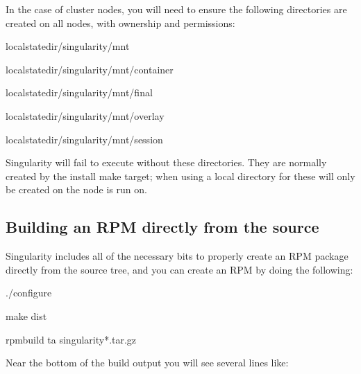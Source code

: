 \documentclass[letterpaper,10pt,english]{sphinxmanual}
\begin{document}
In the case of cluster nodes, you will need to ensure the following
directories are created on all nodes, with  ownership and  permissions:

%
\begin{sphinxVerbatim}[commandchars=\\\{\}]
\PYGZdl{}\PYGZob{}localstatedir\PYGZcb{}/singularity/mnt

\PYGZdl{}\PYGZob{}localstatedir\PYGZcb{}/singularity/mnt/container

\PYGZdl{}\PYGZob{}localstatedir\PYGZcb{}/singularity/mnt/final

\PYGZdl{}\PYGZob{}localstatedir\PYGZcb{}/singularity/mnt/overlay

\PYGZdl{}\PYGZob{}localstatedir\PYGZcb{}/singularity/mnt/session
\end{sphinxVerbatim}

Singularity will fail to execute without these directories. They are
normally created by the install make target; when using a local
directory for  these will only be created on the node  is run on.


\subsection{Building an RPM directly from the source}
\label{\detokenize{admin_quickstart:building-an-rpm-directly-from-the-source}}
Singularity includes all of the necessary bits to properly create an RPM
package directly from the source tree, and you can create an RPM by
doing the following:

%
\begin{sphinxVerbatim}[commandchars=\\\{\}]
\PYGZdl{} ./configure

\PYGZdl{} make dist

\PYGZdl{} rpmbuild \PYGZhy{}ta singularity\PYGZhy{}*.tar.gz
\end{sphinxVerbatim}

Near the bottom of the build output you will see several lines like:
\end{document}
